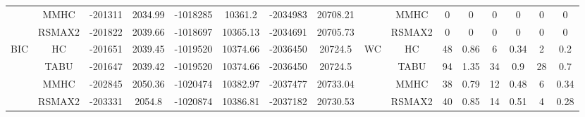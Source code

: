 \begin{table}[p]
{\begin{tabular}{cc||cc|cc|cc||cc|cc|cc|cc}
& MMHC &	-201311 & 	2034.99 & 	-1018285 & 	10361.2 & 	-2034983 & 	20708.21 & 	& MMHC &	0 & 	0 & 	0 & 	0 & 	0 & 	0\tabularnewline													
& RSMAX2 &	-201822 & 	2039.66 & 	-1018697 & 	10365.13 & 	-2034691 & 	20705.73 & 	& RSMAX2 &	0 & 	0 & 	0 & 	0 & 	0 & 	0\tabularnewline													
\hline																										
\multirow{4}{*}{BIC} & HC &	-201651 & 	2039.45 & 	-1019520 & 	10374.66 & 	-2036450 & 	20724.5 & 	\multirow{4}{*}{WC} & HC &	48 & 	0.86 & 	6 & 	0.34 & 	2 & 	0.2\tabularnewline													
& TABU &	-201647 & 	2039.42 & 	-1019520 & 	10374.66 & 	-2036450 & 	20724.5 & 	& TABU &	94 & 	1.35 & 	34 & 	0.9 & 	28 & 	0.7\tabularnewline													
& MMHC &	-202845 & 	2050.36 & 	-1020474 & 	10382.97 & 	-2037477 & 	20733.04 & 	& MMHC &	38 & 	0.79 & 	12 & 	0.48 & 	6 & 	0.34\tabularnewline													
& RSMAX2 &	-203331 & 	2054.8 & 	-1020874 & 	10386.81 & 	-2037182 & 	20730.53 & 	& RSMAX2 &	40 & 	0.85 & 	14 & 	0.51 & 	4 & 	0.28\tabularnewline													
\hline																										
\end{tabular}																										
}																										
\end{table}																										


